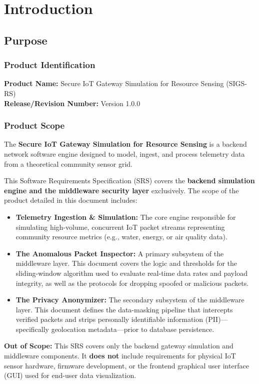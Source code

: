 \documentclass[12pt,letterpaper]{article}
\begin{document}
\section{Introduction}
\subsection{Purpose }
\subsubsection{Product Identification}
\textbf{Product Name:} Secure IoT Gateway Simulation for Resource Sensing (SIGS-RS) \\\textbf{Release/Revision Number:} Version 1.0.0\par
\subsubsection{Product Scope}
The \textbf{Secure IoT Gateway Simulation for Resource Sensing} is a backend network software engine designed to model, ingest, and process telemetry data from a theoretical community sensor grid.\par
This Software Requirements Specification (SRS) covers the \textbf{backend simulation engine and the middleware security layer} exclusively. The scope of the product detailed in this document includes:\par
\begin{itemize}
\item \textbf{Telemetry Ingestion \& Simulation:} The core engine responsible for simulating high-volume, concurrent IoT packet streams representing community resource metrics (e.g., water, energy, or air quality data).
\item \textbf{The Anomalous Packet Inspector:} A primary subsystem of the middleware layer. This document covers the logic and thresholds for the sliding-window algorithm used to evaluate real-time data rates and payload integrity, as well as the protocols for dropping spoofed or malicious packets.
\item \textbf{The Privacy Anonymizer:} The secondary subsystem of the middleware layer. This document defines the data-masking pipeline that intercepts verified packets and strips personally identifiable information (PII)—specifically geolocation metadata—prior to database persistence.
\end{itemize}
\textbf{Out of Scope:} This SRS covers only the backend gateway simulation and middleware components. It \textbf{does not} include requirements for physical IoT sensor hardware, firmware development, or the frontend graphical user interface (GUI) used for end-user data visualization.\par
\vspace{0.08in}
\end{document}

